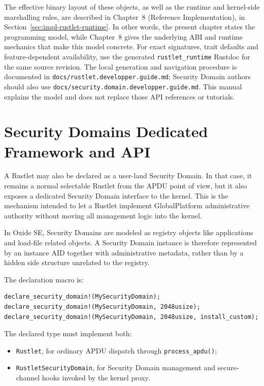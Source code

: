 The effective binary layout of these objects, as well as the runtime and
kernel-side marshalling rules, are described in Chapter~8 (Reference
Implementation), in Section~\ref{sec:impl-rustlet-runtime}. In other
words, the present chapter states the programming model, while
Chapter~8 gives the underlying ABI and runtime mechanics that make this
model concrete.
For exact signatures, trait defaults and feature-dependent availability,
use the generated \texttt{rustlet\_runtime} Rustdoc for the same source
revision. The local generation and navigation procedure is documented in
\texttt{docs/rustlet.developper.guide.md}; Security Domain authors should
also use \texttt{docs/security.domain.developper.guide.md}. This manual
explains the model and does not replace those API references or tutorials.

\section{Security Domains Dedicated Framework and API}
\label{sec:rustlets-security-domain-framework}

A Rustlet may also be declared as a user-land Security Domain. In that
case, it remains a normal selectable Rustlet from the APDU point of
view, but it also exposes a dedicated Security Domain interface to the
kernel. This is the mechanism intended to let a Rustlet implement
GlobalPlatform administrative authority without moving all management
logic into the kernel.

In Oxide SE, Security Domains are modeled as registry objects like
applications and load-file related objects. A Security Domain instance is
therefore represented by an instance AID together with administrative metadata,
rather than by a hidden side structure unrelated to the registry.

The declaration macro is:
\begin{verbatim}
declare_security_domain!(MySecurityDomain);
declare_security_domain!(MySecurityDomain, 2048usize);
declare_security_domain!(MySecurityDomain, 2048usize, install_custom);
\end{verbatim}

The declared type must implement both:
\begin{itemize}
\item \texttt{Rustlet}, for ordinary APDU dispatch through
  \texttt{process\_apdu()};
\item \texttt{RustletSecurityDomain}, for Security Domain management
  and secure-channel hooks invoked by the kernel proxy.
\end{itemize}

